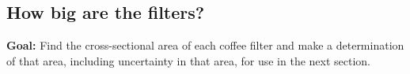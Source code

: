 \subsection{How big are the filters?}


\textbf{Goal:} Find the cross-sectional area of each coffee filter and make a determination of that area, including uncertainty in that area, for use in the next section.
 

